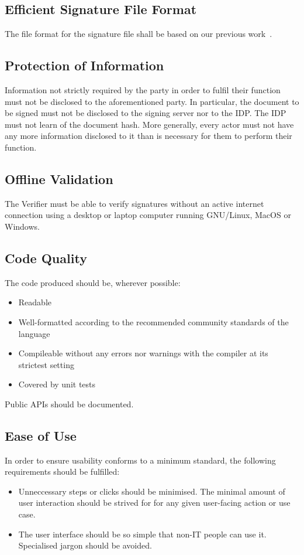 \subsection{Efficient Signature File Format}\label{subsec:efficient-signature-file-format}
The file format for the signature file shall be based on our previous work~\cite{projekt2}.

\subsection{Protection of Information}\label{subsec:protection-of-information}
Information not strictly required by the party in order to fulfil their function must not be disclosed to the aforementioned party.
In particular, the document to be signed must not be disclosed to the signing server nor to the \gls{IDP}.
The \gls{IDP} must not learn of the document hash.
More generally, every actor must not have any more information disclosed to it than is necessary for them to perform their function.

\subsection{Offline Validation}\label{subsec:offline-validation}
The Verifier must be able to verify signatures without an active internet connection using a desktop or laptop computer running GNU/Linux, MacOS or Windows.

\subsection{Code Quality}\label{subsec:code-quality}
The code produced should be, wherever possible:
\begin{itemize}
    \item Readable
    \item Well-formatted according to the recommended community standards of the language
    \item Compileable without any errors nor warnings with the compiler at its strictest setting
    \item Covered by unit tests
\end{itemize}
Public \gls{API}s should be documented.

\subsection{Ease of Use}\label{subsec:ease-of-use}
In order to ensure usability conforms to a minimum standard, the following requirements should be fulfilled:
\begin{itemize}
    \item Unneccessary steps or clicks should be minimised. The minimal amount of user interaction should be strived for for any given user-facing action or use case.
    \item The user interface should be so simple that non-IT people can use it. Specialised jargon should be avoided.
\end{itemize}

